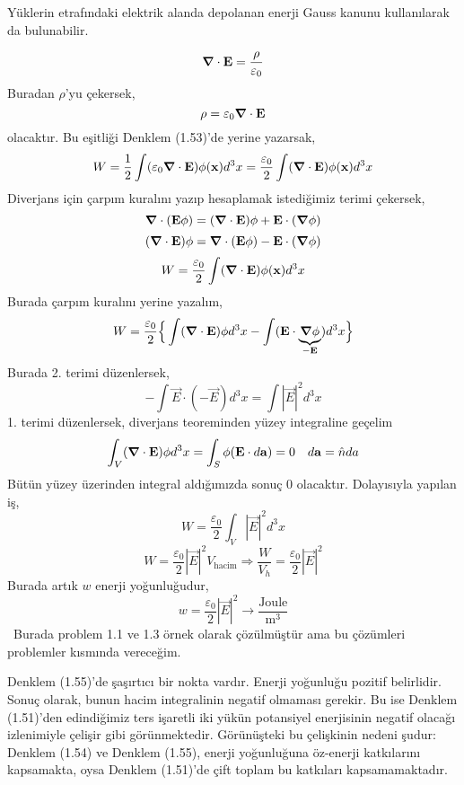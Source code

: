 \newpage

\begin{theorem}
Yüklerin etrafındaki elektrik alanda depolanan enerji Gauss kanunu kullanılarak da bulunabilir.

\[ \grad \cdot \mathbf{E} = \dfrac{\rho}{\varepsilon_{0}}\]
Buradan $\rho$'yu çekersek,
\[ \rho = \varepsilon_{0} \grad \cdot \Vec{E} \]
olacaktır. Bu eşitliği Denklem (1.53)'de yerine yazarsak,
\[ W = \dfrac{1}{2} \int ( \varepsilon_{0} \grad \cdot \Vec{E}) \phi (\Vec{x}) d^{3}x = \dfrac{\varepsilon_{0}}{2} \int (\grad \cdot \Vec{E}) \phi (\Vec{x}) d^{3}x  \]
Diverjans için çarpım kuralını yazıp hesaplamak istediğimiz terimi çekersek,
\[ \grad \cdot (\Vec{E} \phi) = (\grad \cdot \Vec{E}) \phi + \Vec{E} \cdot (\grad \phi) \]
\[ (\grad \cdot \Vec{E}) \phi =  \grad \cdot (\Vec{E} \phi) - \Vec{E} \cdot (\grad \phi) \]
\[  W =  \dfrac{\varepsilon_{0}}{2} \int (\grad \cdot \Vec{E}) \phi (\Vec{x}) d^{3}x  \]
Burada çarpım kuralını yerine yazalım,
\[  W =  \dfrac{\varepsilon_{0}}{2} \Big\{  \int (\grad \cdot \Vec{E}) \phi d^{3}x - \int (\Vec{E} \cdot \underbrace{\grad \phi}_{-\Vec{E}})  d^{3}x \Big\}\]
Burada 2. terimi düzenlersek,
\[ - \int \Vec{E} \cdot (-\Vec{E}) d^{3}x = \int |\Vec{E}|^{2}  d^{3}x \]
1. terimi düzenlersek, diverjans teoreminden yüzey integraline geçelim
\[ \int_{V} (\grad \cdot \Vec{E}) \phi  d^{3}x = \int_{S} \phi (\Vec{E} \cdot d\vec{a}) = 0 \quad d\Vec{a} = \hat{n} da\]
Bütün yüzey üzerinden integral aldığımızda sonuç 0 olacaktır. Dolayısıyla yapılan iş,
\[  W =  \dfrac{\varepsilon_{0}}{2} \int_{V} |\Vec{E}|^{2}  d^{3}x \tag{1.54}\]
\[  W =  \dfrac{\varepsilon_{0}}{2}  |\Vec{E}|^{2}  V_{\textrm{hacim}} \Rightarrow \dfrac{W}{V_{h}} = \dfrac{\varepsilon_{0}}{2} |\Vec{E}|^{2} \]
Burada artık $w$ enerji yoğunluğudur,
\[ w = \dfrac{\varepsilon_{0}}{2} |\Vec{E}|^{2} \rightarrow \dfrac{\text{Joule}}{\text{m}^{3}} \tag{1.55}  \]
\dangersign \ Burada problem 1.1 ve 1.3 örnek olarak çözülmüştür ama bu çözümleri problemler kısmında vereceğim.
\end{theorem}

Denklem (1.55)'de şaşırtıcı bir nokta vardır. Enerji yoğunluğu pozitif belirlidir. Sonuç olarak, bunun hacim integralinin negatif olmaması gerekir. Bu ise Denklem (1.51)'den edindiğimiz ters işaretli iki yükün potansiyel enerjisinin negatif olacağı izlenimiyle çelişir gibi görünmektedir. Görünüşteki bu çelişkinin nedeni şudur: Denklem (1.54) ve Denklem (1.55), enerji yoğunluğuna öz-enerji katkılarını kapsamakta, oysa Denklem (1.51)'de çift toplam bu katkıları kapsamamaktadır.

